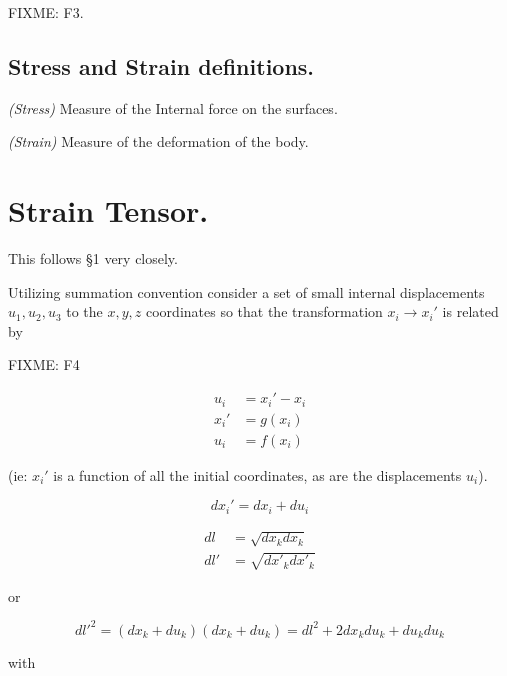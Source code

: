 FIXME: F3.

\subsection{Stress and Strain definitions.}

\begin{definition}
\emph{(Stress)}
\label{dfn:continuumL2:10}
Measure of the Internal force on the surfaces.
\end{definition}

\begin{definition}
\emph{(Strain)}
\label{dfn:continuumL2:30}
Measure of the deformation of the body.
\end{definition}

\section{Strain Tensor.}

This follows \cite{landau1960theory} \S 1 very closely.

Utilizing summation convention consider a set of small internal displacements $u_1, u_2, u_3$ to the $x, y, z$ coordinates so that the transformation $x_i \rightarrow x_i'$ is related by

FIXME: F4

\begin{align}\label{eqn:continuumL2:50}
u_i &= x_i' - x_i \\
x_i' &= g(x_i) \\
u_i &= f(x_i)
\end{align}

(ie: $x_i'$ is a function of all the initial coordinates, as are the displacements $u_i$).

\begin{equation}\label{eqn:continuumL2:70}
dx_i' = dx_i + du_i
\end{equation}

\begin{align}\label{eqn:continuumL2:90}
dl &= \sqrt{dx_k dx_k} \\
dl' &= \sqrt{d{x'}_k d{x'}_k}
\end{align}

or

\begin{equation}\label{eqn:continuumL2:110}
{dl'}^2 = 
(dx_k + du_k)
(dx_k + du_k)
= 
dl^2 + 2 dx_k du_k + du_k du_k
\end{equation}

with 

